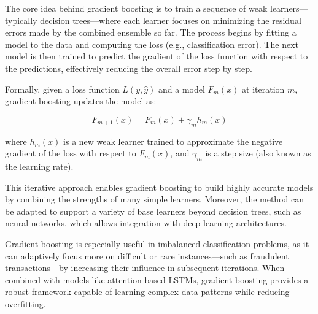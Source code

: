 The core idea behind gradient boosting is to train a sequence of weak learners—typically decision trees—where each learner focuses on minimizing the residual errors made by the combined ensemble so far. The process begins by fitting a model to the data and computing the loss (e.g., classification error). The next model is then trained to predict the gradient of the loss function with respect to the predictions, effectively reducing the overall error step by step.

Formally, given a loss function $L(y, \hat{y})$ and a model $F_m(x)$ at iteration $m$, gradient boosting updates the model as:

\[
F_{m+1}(x) = F_m(x) + \gamma_m h_m(x)
\]

where $h_m(x)$ is a new weak learner trained to approximate the negative gradient of the loss with respect to $F_m(x)$, and $\gamma_m$ is a step size (also known as the learning rate).

This iterative approach enables gradient boosting to build highly accurate models by combining the strengths of many simple learners. Moreover, the method can be adapted to support a variety of base learners beyond decision trees, such as neural networks, which allows integration with deep learning architectures.

Gradient boosting is especially useful in imbalanced classification problems, as it can adaptively focus more on difficult or rare instances—such as fraudulent transactions—by increasing their influence in subsequent iterations. When combined with models like attention-based LSTMs, gradient boosting provides a robust framework capable of learning complex data patterns while reducing overfitting.